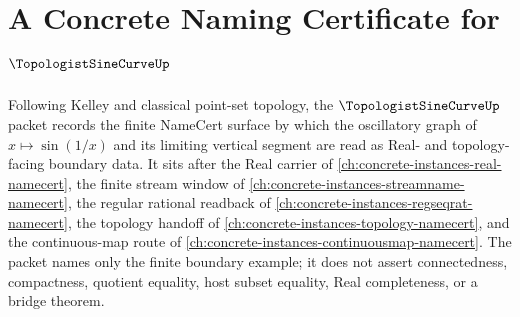 \chapter{A Concrete Naming Certificate for $\TopologistSineCurveUp$}
\label{ch:concrete-instances-topologist-sine-curve-namecert}

Following Kelley and classical point-set topology, the $\TopologistSineCurveUp$ packet records the finite NameCert surface by which the oscillatory graph of $x \mapsto \sin(1/x)$ and its limiting vertical segment are read as Real- and topology-facing boundary data. It sits after the Real carrier of \autoref{ch:concrete-instances-real-namecert}, the finite stream window of \autoref{ch:concrete-instances-streamname-namecert}, the regular rational readback of \autoref{ch:concrete-instances-regseqrat-namecert}, the topology handoff of \autoref{ch:concrete-instances-topology-namecert}, and the continuous-map route of \autoref{ch:concrete-instances-continuousmap-namecert}. The packet names only the finite boundary example; it does not assert connectedness, compactness, quotient equality, host subset equality, Real completeness, or a bridge theorem.


